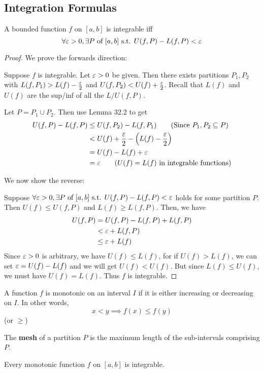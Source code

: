\documentclass{article}
\begin{document}
\subsection{Integration Formulas}
\begin{cthm}[Theorem 32.5]
  A bounded function $f$ on $[a, b]$ is integrable iff \[
    \forall \varepsilon > 0, \exists P \text{ of } [a, b] \text{ s.t. } U(f, P) - L(f, P) < \varepsilon
  \]
\end{cthm}
\begin{proof}
  We prove the forwards direction:

  Suppose $f$ is integrable. Let $\varepsilon > 0$ be given. Then there exists partitions $P_1, P_2$ with $L(f, P_1) > L(f) - \frac{\varepsilon}{2}$ and $U(f, P_2) < U(f) + \frac{\varepsilon}{2}$. Recall that $L(f)$ and $U(f)$ are the sup/inf of all the $L/U(f, P)$.

  Let $P = P_1 \cup P_2$. Then use Lemma 32.2 to get
  \begin{align*}
    U(f, P) - L(f, P) &\leq U(f, P_2) - L(f, P_1) \tag{Since $P_1, P_2 \subseteq P$}\\
    &< U(f) + \frac{\varepsilon}{2} - \left(L(f) - \frac{\varepsilon}{2}\right)\\
    &= U(f) - L(f) + \varepsilon\\
    &= \varepsilon \tag{$U(f) = L(f)$ in integrable functions}\\
  \end{align*}

  We now show the reverse:

  Suppose $\forall \varepsilon > 0, \exists P \text{ of } [a, b] \text{ s.t. } U(f, P) - L(f, P) < \varepsilon$ holds for some partition $P$. Then $U(f) \leq U(f, P)$ and $L(f) \geq L(f, P)$. Then, we have
  \begin{align*}
    U(f, P) &= U(f, P) - L(f, P) + L(f, P)\\
    &< \varepsilon + L(f, P)\\
    &\leq \varepsilon + L(f)\\
  \end{align*}
  Since $\varepsilon > 0$ is arbitrary, we have $U(f) \leq L(f)$, for if $U(f) > L(f)$, we can set $\varepsilon = U(f) - L(f)$ and we will get $U(f) < U(f).$  But since $L(f) \leq U(f)$, we must have $U(f) = L(f)$. Thus $f$ is integrable.
\end{proof}
\begin{definition}
  A function $f$ is monotonic on an interval $I$ if it is either increasing or decreasing on $I$. In other words, \[
    x < y \implies f(x) \leq f(y)
  \] (or $\geq$)
\end{definition}
\begin{definition}
  The \textbf{mesh} of a partition $P$ is the maximum length of the sub-intervals comprising $P$.
\end{definition}
\begin{cthm}[Theorem 33.1]
  Every monotonic function $f$ on $[a, b]$ is integrable.
\end{cthm}
\end{document}
